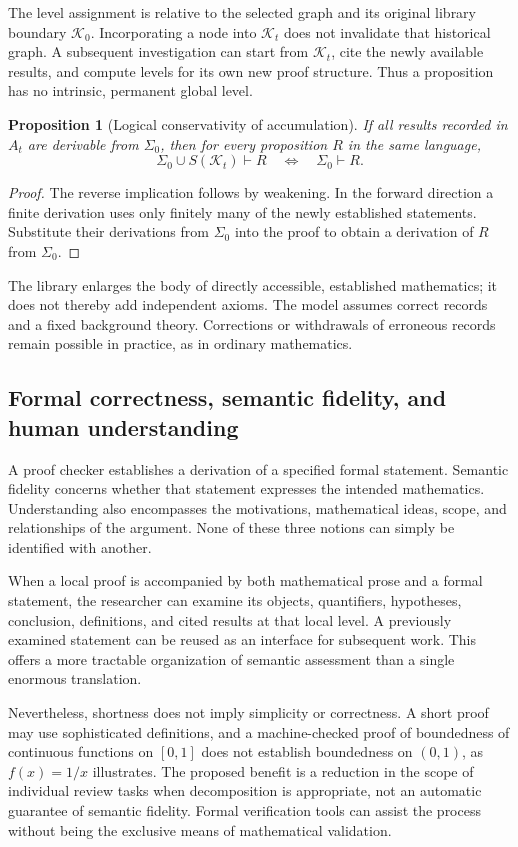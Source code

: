 \documentclass[11pt,a4paper]{article}
\newtheorem{proposition}{Proposition}
\theoremstyle{definition}\newtheorem{definition}{Definition}
\newcommand{\K}{\mathcal K}
\begin{document}
The level assignment is relative to the selected graph and its original library boundary $\K_0$. Incorporating a node into $\K_t$ does not invalidate that historical graph. A subsequent investigation can start from $\K_t$, cite the newly available results, and compute levels for its own new proof structure. Thus a proposition has no intrinsic, permanent global level.

\begin{proposition}[Logical conservativity of accumulation]\label{prop:conservative}
If all results recorded in $A_t$ are derivable from $\Sigma_0$, then for every proposition $R$ in the same language,
\[
 \Sigma_0\cup S(\K_t)\vdash R\quad\Longleftrightarrow\quad\Sigma_0\vdash R.
\]
\end{proposition}
\begin{proof}
The reverse implication follows by weakening. In the forward direction a finite derivation uses only finitely many of the newly established statements. Substitute their derivations from $\Sigma_0$ into the proof to obtain a derivation of $R$ from $\Sigma_0$.
\end{proof}
The library enlarges the body of directly accessible, established mathematics; it does not thereby add independent axioms. The model assumes correct records and a fixed background theory. Corrections or withdrawals of erroneous records remain possible in practice, as in ordinary mathematics.

\subsection{Formal correctness, semantic fidelity, and human understanding}
A proof checker establishes a derivation of a specified formal statement. Semantic fidelity concerns whether that statement expresses the intended mathematics. Understanding also encompasses the motivations, mathematical ideas, scope, and relationships of the argument. None of these three notions can simply be identified with another.

When a local proof is accompanied by both mathematical prose and a formal statement, the researcher can examine its objects, quantifiers, hypotheses, conclusion, definitions, and cited results at that local level. A previously examined statement can be reused as an interface for subsequent work. This offers a more tractable organization of semantic assessment than a single enormous translation.

Nevertheless, shortness does not imply simplicity or correctness. A short proof may use sophisticated definitions, and a machine-checked proof of boundedness of continuous functions on $[0,1]$ does not establish boundedness on $(0,1)$, as $f(x)=1/x$ illustrates. The proposed benefit is a reduction in the scope of individual review tasks when decomposition is appropriate, not an automatic guarantee of semantic fidelity. Formal verification tools can assist the process without being the exclusive means of mathematical validation.
\end{document}
